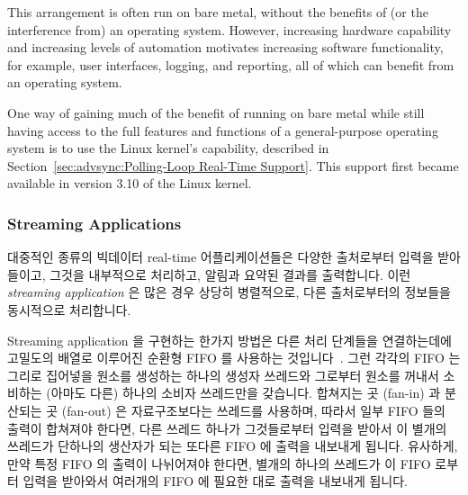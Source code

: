 This arrangement is often run on bare metal, without the benefits of
(or the interference from) an operating system.
However, increasing hardware capability and increasing levels of
automation motivates increasing software functionality, for example,
user interfaces, logging, and reporting, all of which can benefit from
an operating system.

One way of gaining much of the benefit of running on bare metal while
still having access to the full features and functions of a
general-purpose operating system is to use the Linux kernel's
 capability, described in
Section~\ref{sec:advsync:Polling-Loop Real-Time Support}.
This support first became available in version 3.10 of the Linux kernel.
\fi

\subsubsection{Streaming Applications}
\label{sec:advsync:Streaming Applications}

대중적인 종류의 빅데이터 real-time 어플리케이션들은 다양한 출처로부터 입력을
받아들이고, 그것을 내부적으로 처리하고, 알림과 요약된 결과를 출력합니다.
이런 \emph{streaming application} 은 많은 경우 상당히 병렬적으로, 다른
출처로부터의 정보들을 동시적으로 처리합니다.

Streaming application 을 구현하는 한가지 방법은 다른 처리 단계들을 연결하는데에
고밀도의 배열로 이루어진 순환형 FIFO 를 사용하는
것입니다~\cite{AdrianSutton2013LCA:Disruptor}.
그런 각각의 FIFO 는 그리로 집어넣을 원소를 생성하는 하나의 생성자 쓰레드와
그로부터 원소를 꺼내서 소비하는 (아마도 다른) 하나의 소비자 쓰레드만을
갖습니다.
합쳐지는 곳 (fan-in) 과 분산되는 곳 (fan-out) 은 자료구조보다는 쓰레드를
사용하며, 따라서 일부 FIFO 들의 출력이 합쳐져야 한다면, 다른 쓰레드 하나가
그것들로부터 입력을 받아서 이 별개의 쓰레드가 단하나의 생산자가 되는 또다른
FIFO 에 출력을 내보내게 됩니다.
유사하게, 만약 특정 FIFO 의 출력이 나뉘어져야 한다면, 별개의 하나의 쓰레드가 이
FIFO 로부터 입력을 받아와서 여러개의 FIFO 에 필요한 대로 출력을 내보내게
됩니다.

